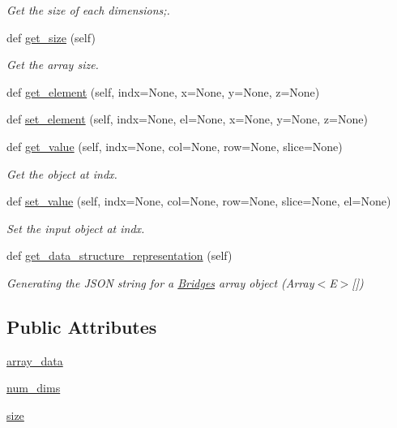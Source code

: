 \begin{DoxyCompactItemize}
\begin{DoxyCompactList}\small\item\em Get the size of each dimensions;. \end{DoxyCompactList}\item 
def \mbox{\hyperlink{class_bridges_1_1_array_1_1_array_a6b3843b3cd57ab072c7db1ca6c107d1d}{get\+\_\+size}} (self)
\begin{DoxyCompactList}\small\item\em Get the array size. \end{DoxyCompactList}\item 
def \mbox{\hyperlink{class_bridges_1_1_array_1_1_array_a3bc6a21dcf8792e45e39129044d186db}{get\+\_\+element}} (self, indx=None, x=None, y=None, z=None)
\item 
def \mbox{\hyperlink{class_bridges_1_1_array_1_1_array_a8a8ed85d66efca1049351abab01ab9c3}{set\+\_\+element}} (self, indx=None, el=None, x=None, y=None, z=None)
\item 
def \mbox{\hyperlink{class_bridges_1_1_array_1_1_array_a45379fc5c5b5c039ac75b01cd40195dd}{get\+\_\+value}} (self, indx=None, col=None, row=None, slice=None)
\begin{DoxyCompactList}\small\item\em Get the object at \textquotesingle{}indx\textquotesingle{}. \end{DoxyCompactList}\item 
def \mbox{\hyperlink{class_bridges_1_1_array_1_1_array_a900af8a17ee9cac42e2d23b00562a783}{set\+\_\+value}} (self, indx=None, col=None, row=None, slice=None, el=None)
\begin{DoxyCompactList}\small\item\em Set the input object at \textquotesingle{}indx\textquotesingle{}. \end{DoxyCompactList}\item 
def \mbox{\hyperlink{class_bridges_1_1_array_1_1_array_a2ff4613545bb6df7554b8f87fc7473fd}{get\+\_\+data\+\_\+structure\+\_\+representation}} (self)
\begin{DoxyCompactList}\small\item\em Generating the J\+S\+ON string for a \mbox{\hyperlink{namespace_bridges_1_1_bridges}{Bridges}} array object (Array$<$\+E$>$\mbox{[}\mbox{]}) \end{DoxyCompactList}\end{DoxyCompactItemize}
\subsection*{Public Attributes}
\begin{DoxyCompactItemize}
\item 
\mbox{\hyperlink{class_bridges_1_1_array_1_1_array_adad31f6bdd4c1c1fb95fab792d37455d}{array\+\_\+data}}
\item 
\mbox{\hyperlink{class_bridges_1_1_array_1_1_array_a61af14f906e3657866062bef69621445}{num\+\_\+dims}}
\item 
\mbox{\hyperlink{class_bridges_1_1_array_1_1_array_a63534e5d3bdcfbc18950ae0db5d7247c}{size}}
\end{DoxyCompactItemize}
